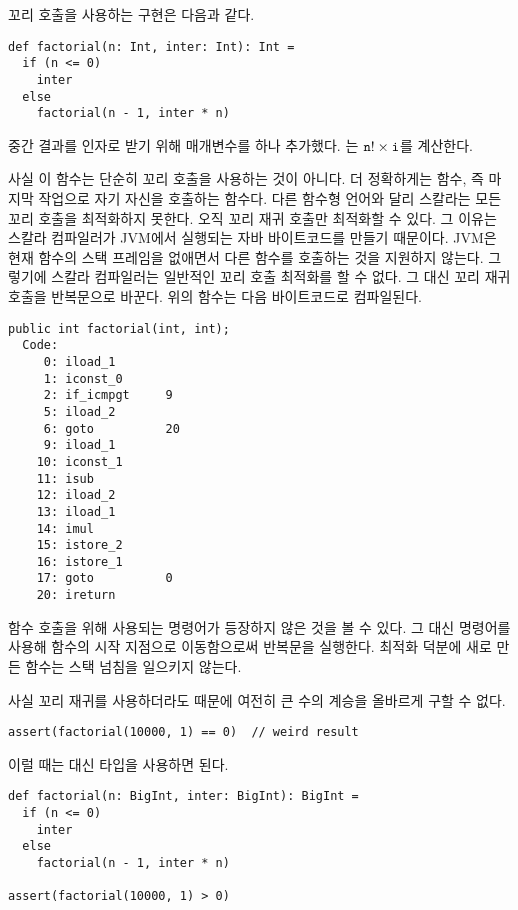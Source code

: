 꼬리 호출을 사용하는  구현은 다음과 같다.

\begin{verbatim}
def factorial(n: Int, inter: Int): Int =
  if (n <= 0)
    inter
  else
    factorial(n - 1, inter * n)
\end{verbatim}

중간 결과를 인자로 받기 위해 매개변수를 하나 추가했다. 는
$\texttt{n}!\times\texttt{i}$를 계산한다.

사실 이 함수는 단순히 꼬리 호출을 사용하는 것이 아니다. 더 정확하게는
 함수, 즉 마지막 작업으로 자기 자신을 호출하는 함수다. 다른
함수형 언어와 달리 스칼라는 모든 꼬리 호출을 최적화하지 못한다. 오직 꼬리 재귀
호출만 최적화할 수 있다. 그 이유는 스칼라 컴파일러가 JVM에서 실행되는 자바
바이트코드를 만들기 때문이다. JVM은 현재 함수의 스택 프레임을 없애면서 다른
함수를 호출하는 것을 지원하지 않는다. 그렇기에 스칼라 컴파일러는 일반적인 꼬리
호출 최적화를 할 수 없다. 그 대신 꼬리 재귀 호출을 반복문으로 바꾼다. 위의
 함수는 다음 바이트코드로 컴파일된다.

\begin{verbatim}
public int factorial(int, int);
  Code:
     0: iload_1
     1: iconst_0
     2: if_icmpgt     9
     5: iload_2
     6: goto          20
     9: iload_1
    10: iconst_1
    11: isub
    12: iload_2
    13: iload_1
    14: imul
    15: istore_2
    16: istore_1
    17: goto          0
    20: ireturn
\end{verbatim}

함수 호출을 위해 사용되는  명령어가 등장하지 않은 것을 볼 수 있다.
그 대신  명령어를 사용해 함수의 시작 지점으로 이동함으로써 반복문을
실행한다. 최적화 덕분에 새로 만든  함수는 스택 넘침을 일으키지 않는다.

사실 꼬리 재귀를 사용하더라도  때문에
여전히 큰 수의 계승을 올바르게 구할 수 없다.

\begin{verbatim}
assert(factorial(10000, 1) == 0)  // weird result
\end{verbatim}

이럴 때는  대신  타입을 사용하면 된다.

\begin{verbatim}
def factorial(n: BigInt, inter: BigInt): BigInt =
  if (n <= 0)
    inter
  else
    factorial(n - 1, inter * n)

assert(factorial(10000, 1) > 0)
\end{verbatim}

